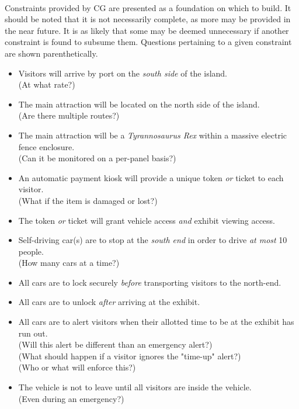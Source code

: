 \documentclass[12pt]{article}
\begin{document}
	\paragraph{} Constraints provided by CG are presented as a foundation on which to build. It should be 
	noted that it is not necessarily complete, as more may be provided in the near future. It is as likely 
	that some may be deemed unnecessary if another constraint is found to subsume them. Questions pertaining 
	to a given constraint are shown parenthetically.
	\begin{itemize}
		\item Visitors will arrive by port on the \textit{south side} of the island.
		\\(At what rate?)
		\item The main attraction will be located on the north side of the island. 
		\\(Are there multiple routes?)
		\item The main attraction will be a \textit{Tyrannosaurus Rex} within a massive electric fence enclosure. 
		\\(Can it be monitored on a per-panel basis?)
		\item An automatic payment kiosk will provide a unique token \textit{or} ticket to each visitor. 
		\\(What if the item is damaged or lost?)
		\item The token \textit{or} ticket will grant vehicle access \textit{and} exhibit viewing access.
		\item Self-driving car(s) are to stop at the \textit{south end} in order to drive \textit{at most} 10 people. 
		\\(How many cars at a time?)
		\item All cars are to lock securely \textit{before} transporting visitors to the north-end.
		\item All cars are to unlock \textit{after} arriving at the exhibit.
		\item All cars are to alert visitors when their allotted time to be at the exhibit has run out. 
		\\(Will this alert be different than an emergency alert?)
		\\(What should happen if a visitor ignores the "time-up" alert?)
		\\(Who or what will enforce this?)
		\item The vehicle is not to leave until all visitors are inside the vehicle. 
		\\(Even during an emergency?)

\end{itemize}
\end{document}
